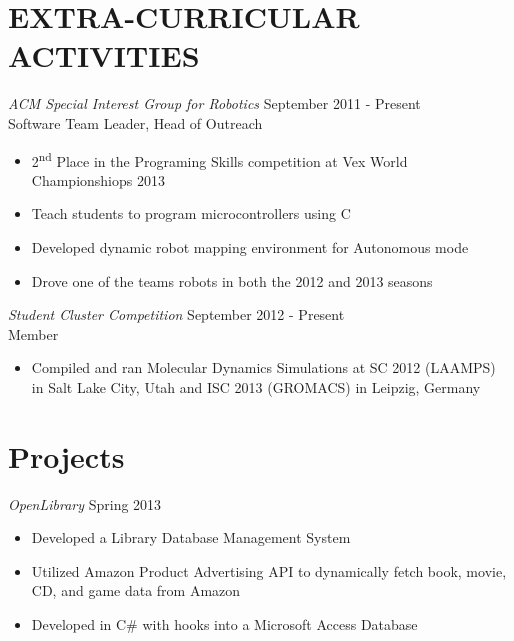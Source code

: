 \documentclass[line,margin]{res}
\begin{document}
\begin{resume}
\section{\textcolor{OliveGreen}{EXTRA-CURRICULAR ACTIVITIES}}
				{\sl ACM Special Interest Group for Robotics} \hfill September 2011 - Present \\
                Software Team Leader, Head of Outreach
                \begin{itemize}  \itemsep -2pt %
                  \item 2\textsuperscript{nd} Place in the Programing Skills competition at Vex World Championshiops 2013
                  \item Teach students to program microcontrollers using C
                  \item Developed dynamic robot mapping environment for Autonomous mode
                  \item Drove one of the teams robots in both the 2012 and 2013 seasons
                \end{itemize}
                
        {\sl Student Cluster Competition} \hfill September 2012 - Present \\
                Member
                \begin{itemize}  \itemsep -2pt %
                  \item Compiled and ran Molecular Dynamics Simulations at SC 2012 (LAAMPS) in Salt Lake City, Utah and ISC 2013 (GROMACS) in Leipzig, Germany
                \end{itemize}
                
\section{\textcolor{OliveGreen}{Projects}}
				{\sl OpenLibrary} \hfill Spring 2013
                \begin{itemize}  \itemsep -2pt %
                  \item Developed a Library Database Management System
                  \item Utilized Amazon Product Advertising API to dynamically fetch book, movie, CD, and game data from Amazon
                  \item Developed in C\# with hooks into a Microsoft Access Database
                \end{itemize}
                

\end{resume}
\end{document}
